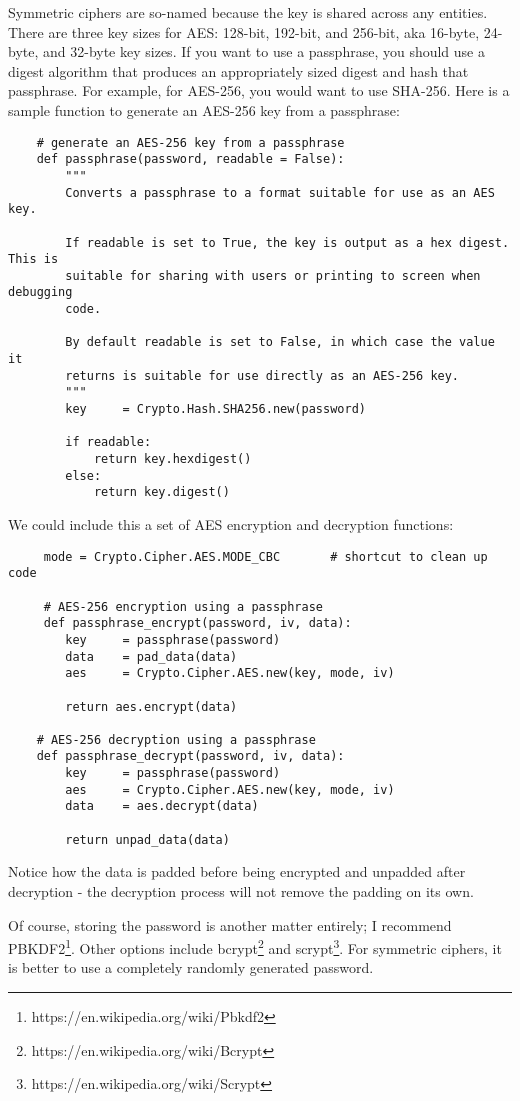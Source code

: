 \documentclass[letterpaper,10pt]{article}
\begin{document}
Symmetric ciphers are so-named because the key is shared across any entities.
There are three key sizes for AES: 128-bit, 192-bit, and 256-bit, aka 16-byte,
24-byte, and 32-byte key sizes. If you want to use a passphrase, you 
should use a digest algorithm that produces an appropriately sized digest and
hash that passphrase. For example, for AES-256, you would want to use SHA-256.
Here is a sample function to generate an AES-256 key from a passphrase:
\begin{verbatim}
    # generate an AES-256 key from a passphrase
    def passphrase(password, readable = False):
        """
        Converts a passphrase to a format suitable for use as an AES key.

        If readable is set to True, the key is output as a hex digest. This is
        suitable for sharing with users or printing to screen when debugging
        code.

        By default readable is set to False, in which case the value it 
        returns is suitable for use directly as an AES-256 key.
        """
        key     = Crypto.Hash.SHA256.new(password)
    
        if readable:
            return key.hexdigest()
        else:
            return key.digest()
\end{verbatim}
We could include this a set of AES encryption and decryption functions:
\begin{verbatim}
     mode = Crypto.Cipher.AES.MODE_CBC       # shortcut to clean up code

     # AES-256 encryption using a passphrase
     def passphrase_encrypt(password, iv, data):
        key     = passphrase(password)
        data    = pad_data(data)
        aes     = Crypto.Cipher.AES.new(key, mode, iv)

        return aes.encrypt(data)

    # AES-256 decryption using a passphrase
    def passphrase_decrypt(password, iv, data):
        key     = passphrase(password)
        aes     = Crypto.Cipher.AES.new(key, mode, iv)
        data    = aes.decrypt(data)

        return unpad_data(data)
\end{verbatim}
Notice how the data is padded before being encrypted and unpadded after 
decryption - the decryption process will not remove the padding on its own.

Of course, storing the password is another matter entirely; I recommend
PBKDF2\footnote{https://en.wikipedia.org/wiki/Pbkdf2}. Other options include
bcrypt\footnote{https://en.wikipedia.org/wiki/Bcrypt} and 
scrypt\footnote{https://en.wikipedia.org/wiki/Scrypt}. For symmetric ciphers,
it is better to use a completely randomly generated password.
\end{document}
